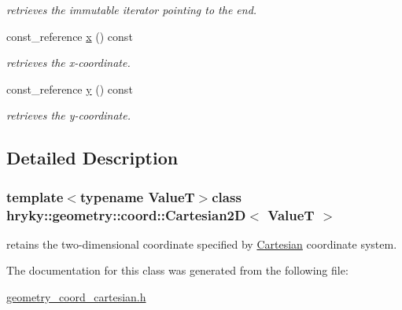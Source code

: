 \begin{DoxyCompactItemize}
\begin{DoxyCompactList}\small\item\em retrieves the immutable iterator pointing to the end. \end{DoxyCompactList}\item 
\hypertarget{classhryky_1_1geometry_1_1coord_1_1_cartesian2_d_a43e730c23f9c35500ca23cdae59d2527}{const\-\_\-reference \hyperlink{classhryky_1_1geometry_1_1coord_1_1_cartesian2_d_a43e730c23f9c35500ca23cdae59d2527}{x} () const }\label{classhryky_1_1geometry_1_1coord_1_1_cartesian2_d_a43e730c23f9c35500ca23cdae59d2527}

\begin{DoxyCompactList}\small\item\em retrieves the x-\/coordinate. \end{DoxyCompactList}\item 
\hypertarget{classhryky_1_1geometry_1_1coord_1_1_cartesian2_d_a585367b45d11a14785e24edabdc459ea}{const\-\_\-reference \hyperlink{classhryky_1_1geometry_1_1coord_1_1_cartesian2_d_a585367b45d11a14785e24edabdc459ea}{y} () const }\label{classhryky_1_1geometry_1_1coord_1_1_cartesian2_d_a585367b45d11a14785e24edabdc459ea}

\begin{DoxyCompactList}\small\item\em retrieves the y-\/coordinate. \end{DoxyCompactList}\end{DoxyCompactItemize}


\subsection{Detailed Description}
\subsubsection*{template$<$typename Value\-T$>$class hryky\-::geometry\-::coord\-::\-Cartesian2\-D$<$ Value\-T $>$}

retains the two-\/dimensional coordinate specified by \hyperlink{classhryky_1_1geometry_1_1coord_1_1_cartesian}{Cartesian} coordinate system. 

The documentation for this class was generated from the following file\-:\begin{DoxyCompactItemize}
\item 
\hyperlink{geometry__coord__cartesian_8h}{geometry\-\_\-coord\-\_\-cartesian.\-h}\end{DoxyCompactItemize}
